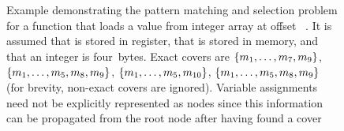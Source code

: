 \begin{figure}
  \centering%
                {%
                  \begin{lstpage}{2.6cm}%
                  \end{lstpage}%
                }%
  \hfill%
  \hfill%

  \caption[Example of the pattern matching and selection problem]%
          {%
            Example demonstrating the pattern matching and selection problem for
            a function that loads a value from integer array  at
            offset \mbox{ \irCode*{\irAddText{}} }.
            It is assumed that  is stored in register, that 
            is stored in memory, and that an integer is four~bytes.
            Exact covers are \mbox{$\mSet{m_1, \ldots, m_7, m_9}$},
            \mbox{$\mSet{m_1, \ldots, m_5, m_8, m_9}$}, \mbox{$\mSet{m_1,
                \ldots, m_5, m_{10}}$}, \mbox{$\mSet{m_1, \ldots, m_5, m_8,
                m_9}$} (for brevity, non-exact covers are ignored).
            Variable assignments need not be explicitly represented as nodes
            since this information can be propagated from the root node after
            having found a cover%
          }
\end{figure}

